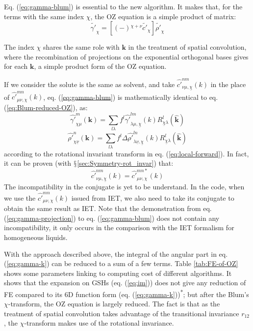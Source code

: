 Eq. (\ref{eq:gamma-blum}) is essential to the new algorithm. It makes
that, for the terms with the same index $\chi$, the \acs{OZ} equation
is a simple product of matrix:
\begin{equation}
\tilde{\gamma'}_{\chi}=\left[\left(-\right){}^{\chi+\nu}\tilde{c'}_{\chi}\right]\tilde{\rho'}_{\chi}
\end{equation}

The index $\chi$ shares the same role with $\mathbf{k}$ in the treatment
of spatial convolution, where the recombination of projections on
the exponential orthogonal bases gives for each $\mathbf{k}$, a simple
product form of the \acs{OZ} equation.

If we consider the solute is the same as solvent, and take $\hat{c'}_{\nu\mu,\underline{\chi}}^{nm}(k)$
in the place of $\hat{c'}_{\mu\nu,\chi}^{mn}(k)$, eq. (\ref{eq:gamma-blum})
is mathematically identical to eq. (\ref{eq:Blum-reduced-OZ}), as:
\begin{equation}
\hat{\gamma'}_{\chi\mu}^{m}(\mathbf{k})=\sum_{l\lambda}f^{l}\hat{\gamma'}_{\lambda\mu,\underline{\chi}}^{lm}(k)R_{\underline{\chi}\lambda}^{l}(\hat{\mathbf{k}})
\end{equation}
\begin{equation}
\hat{\rho'}_{\chi\underline{\nu}}^{n}(\mathbf{k})=\sum_{l\lambda}f^{l}\Delta\hat{\rho'}_{\lambda\underline{\nu},\underline{\chi}}^{ln}(k)R_{\underline{\chi}\lambda}^{l}(\hat{\mathbf{k}})
\end{equation}
according to the rotational invariant transform in eq. (\ref{eq:local-forward}).
In fact, it can be proven (with $\mathsection$\ref{sec:Symmetry-rot_invar})
that:
\begin{equation}
\hat{c'}_{\nu\mu,\underline{\chi}}^{nm}(k)=\hat{c'}_{\mu\nu,\chi}^{mn*}(k)
\end{equation}
The incompatibility in the conjugate is yet to be understand. In the
code, when we use the $\hat{c'}_{\mu\nu,\chi}^{mn}(k)$ issued from
\acs{IET}, we also need to take its conjugate to obtain the same
result as \acs{IET}. Note that the demonstration from eq. (\ref{eq:gamma-projection})
to eq. (\ref{eq:gamma-blum}) does not contain any incompatibility,
it only occurs in the comparison with the \acs{IET} formalism for
homogeneous liquids.

With the approach described above, the integral of the angular part
in eq. (\ref{eq:gamma-k}) can be reduced to a sum of a few terms.
Table \ref{tab:FE-of-OZ} shows some parameters linking to computing
cost of different algorithms. It shows that the expansion on \acs{GSH}s (eq. (\ref{eq:im})) does
not give any reduction of \acs{FE} compared to its 6D function form
(eq. (\ref{eq:gamma-k}))\textsuperscript{{*}}; but after the Blum's
$\chi$-transform, the \acs{OZ} equation is largely reduced. The
fact is that as the treatment of spatial convolution takes advantage
of the transitional invariance $r_{12}$, the $\chi$-transform makes
use of the rotational invariance.

